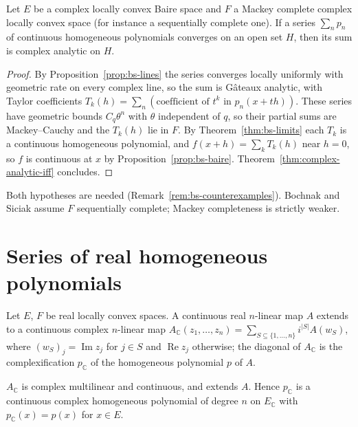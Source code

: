 \begin{theorem}
  \label{thm:bs-52}
  \leanok
  Let $E$ be a complex locally convex Baire space and $F$ a Mackey complete complex locally
  convex space (for instance a sequentially complete one). If a series $\sum_n p_n$ of continuous homogeneous polynomials converges on an
  open set $H$, then its sum is complex analytic on $H$.
\end{theorem}

\begin{proof}
  \leanok
  By Proposition~\ref{prop:bs-lines} the series converges locally uniformly with geometric rate
  on every complex line, so the sum is Gâteaux analytic, with Taylor coefficients
  $T_k(h) = \sum_n (\text{coefficient of } t^k \text{ in } p_n(x + th))$. These series have
  geometric bounds $C_q \theta^n$ with $\theta$ independent of $q$, so their partial sums are
  Mackey--Cauchy and the $T_k(h)$ lie in $F$. By Theorem~\ref{thm:bs-limits} each $T_k$ is a continuous homogeneous
  polynomial, and $f(x + h) = \sum_k T_k(h)$ near $h = 0$, so $f$ is continuous at $x$ by
  Proposition~\ref{prop:bs-baire}. Theorem~\ref{thm:complex-analytic-iff} concludes.
\end{proof}

Both hypotheses are needed (Remark~\ref{rem:bs-counterexamples}). Bochnak and Siciak assume
$F$ sequentially complete; Mackey completeness is strictly weaker.

\section{Series of real homogeneous polynomials}

Let $E$, $F$ be real locally convex spaces. A continuous real $n$-linear map $A$ extends to a
continuous complex $n$-linear map
$A_{\mathbb{C}}(z_1, \dots, z_n) = \sum_{S \subseteq \{1, \dots, n\}} i^{|S|} A(w_S)$, where
$(w_S)_j = \operatorname{Im} z_j$ for $j \in S$ and $\operatorname{Re} z_j$ otherwise; the
diagonal of $A_{\mathbb{C}}$ is the complexification $p_{\mathbb{C}}$ of the homogeneous
polynomial $p$ of $A$.

\begin{lemma}
  \label{lem:complexify-poly}
  \leanok
  $A_{\mathbb{C}}$ is complex multilinear and continuous, and extends $A$. Hence $p_{\mathbb{C}}$
  is a continuous complex homogeneous polynomial of degree $n$ on $E_{\mathbb{C}}$ with
  $p_{\mathbb{C}}(x) = p(x)$ for $x \in E$.
\end{lemma}

